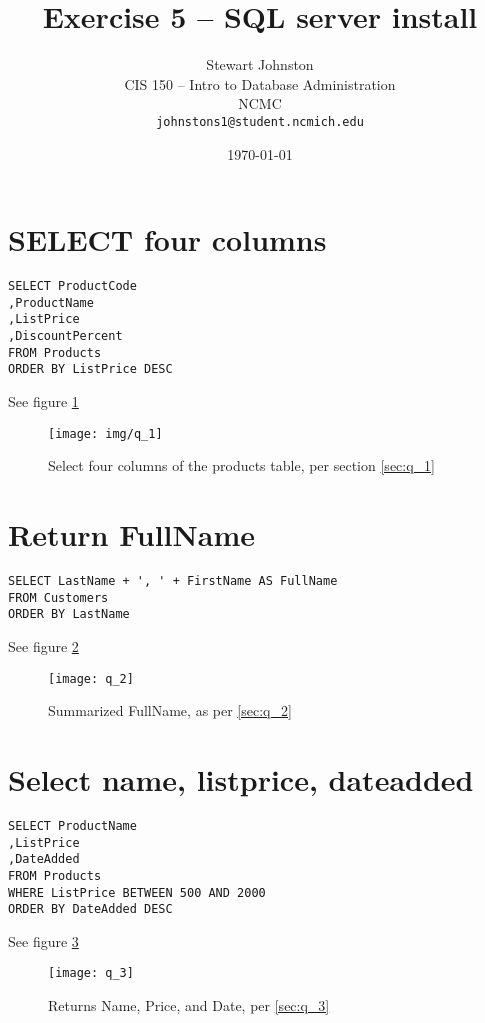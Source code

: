 \documentclass{article}
\title{Exercise 5 -- SQL server install}
\author{Stewart Johnston\\
  {CIS 150 -- Intro to Database Administration}\\
  {NCMC}\\
  {\texttt{johnstons1@student.ncmich.edu}}
}
\date{\today}
\begin{document}
\lstset{language=SQL}

\maketitle

\tableofcontents
\listoffigures

\section{SELECT four columns}

\begin{lstlisting}
SELECT ProductCode
,ProductName
,ListPrice
,DiscountPercent
FROM Products
ORDER BY ListPrice DESC
\end{lstlisting}\label{sec:q_1}
See figure \ref{fig:q_1}

\begin{figure}[H]\centering
	\caption{Select four columns of the products table, per section
	\ref{sec:q_1}}
	\texttt{[image: img/q\_1]}
	\label{fig:q_1}
\end{figure}

\section{Return FullName}

\begin{lstlisting}
SELECT LastName + ', ' + FirstName AS FullName
FROM Customers
ORDER BY LastName
\end{lstlisting}\label{sec:q_2}
See figure \ref{fig:q_2}

\begin{figure}[H]\centering
	\caption{Summarized FullName, as per \ref{sec:q_2}}
	\texttt{[image: q\_2]}
	\label{fig:q_2}
\end{figure}

\section{Select name, listprice, dateadded}

\begin{lstlisting}
SELECT ProductName
,ListPrice
,DateAdded
FROM Products
WHERE ListPrice BETWEEN 500 AND 2000
ORDER BY DateAdded DESC
\end{lstlisting}\label{sec:q_3}
See figure \ref{fig:q_3}

\begin{figure}[H]\centering
	\caption{Returns Name, Price, and Date, per \ref{sec:q_3}}
	\texttt{[image: q\_3]}
	\label{fig:q_3}
\end{figure}
\end{document}
